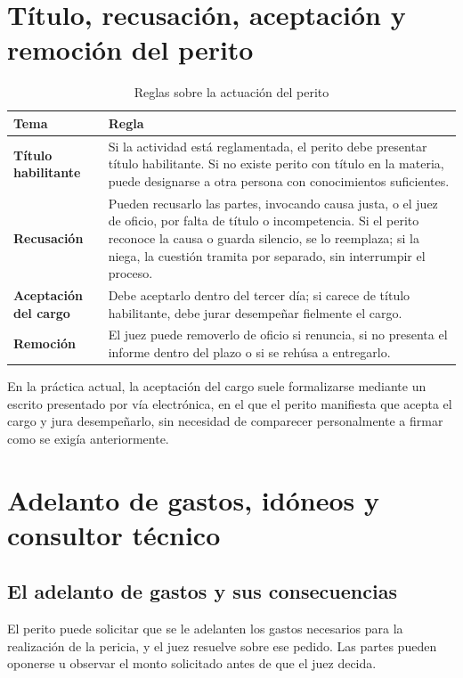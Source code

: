 \documentclass[12pt,oneside]{book}
\begin{document}
\section{Título, recusación, aceptación y remoción del perito}

\begin{table}[H]
\centering
\caption{Reglas sobre la actuación del perito}
\begin{tabularx}{\textwidth}{>{\raggedright\arraybackslash}p{} X}
\toprule
\textbf{Tema} & \textbf{Regla} \\
\midrule
\textbf{Título habilitante} & Si la actividad está reglamentada, el perito debe presentar título habilitante. Si no existe perito con título en la materia, puede designarse a otra persona con conocimientos suficientes. \\
\textbf{Recusación} & Pueden recusarlo las partes, invocando causa justa, o el juez de oficio, por falta de título o incompetencia. Si el perito reconoce la causa o guarda silencio, se lo reemplaza; si la niega, la cuestión tramita por separado, sin interrumpir el proceso. \\
\textbf{Aceptación del cargo} & Debe aceptarlo dentro del tercer día; si carece de título habilitante, debe jurar desempeñar fielmente el cargo. \\
\textbf{Remoción} & El juez puede removerlo de oficio si renuncia, si no presenta el informe dentro del plazo o si se rehúsa a entregarlo. \\
\bottomrule
\end{tabularx}
\end{table}

En la práctica actual, la aceptación del cargo suele formalizarse mediante un escrito presentado por vía electrónica, en el que el perito manifiesta que acepta el cargo y jura desempeñarlo, sin necesidad de comparecer personalmente a firmar como se exigía anteriormente.

\section{Adelanto de gastos, idóneos y consultor técnico}

\subsection{El adelanto de gastos y sus consecuencias}

El perito puede solicitar que se le adelanten los gastos necesarios para la realización de la pericia, y el juez resuelve sobre ese pedido. Las partes pueden oponerse u observar el monto solicitado antes de que el juez decida.
\end{document}
